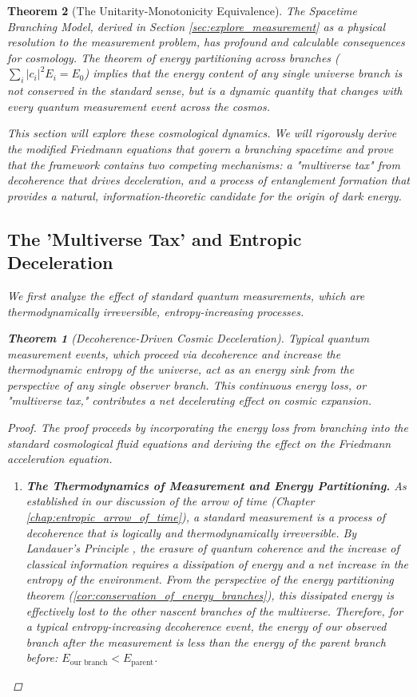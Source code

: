 \documentclass[11pt, letterpaper]{report}
\theoremstyle{plain} %
\newtheorem{theorem}{Theorem}[chapter]
\theoremstyle{definition} %
\theoremstyle{remark} %
\begin{document}
\begin{theorem}[The Unitarity-Monotonicity Equivalence]
The Spacetime Branching Model, derived in Section \ref{sec:explore_measurement} as a physical resolution to the measurement problem, has profound and calculable consequences for cosmology. The theorem of energy partitioning across branches ($\sum_i |c_i|^2 E_i = E_0$) implies that the energy content of any single universe branch is not conserved in the standard sense, but is a dynamic quantity that changes with every quantum measurement event across the cosmos.

This section will explore these cosmological dynamics. We will rigorously derive the modified Friedmann equations that govern a branching spacetime and prove that the framework contains two competing mechanisms: a "multiverse tax" from decoherence that drives deceleration, and a process of entanglement formation that provides a natural, information-theoretic candidate for the origin of dark energy.

\subsection{The 'Multiverse Tax' and Entropic Deceleration}
\label{subsec:explore_deceleration}

We first analyze the effect of standard quantum measurements, which are thermodynamically irreversible, entropy-increasing processes.

\begin{theorem}[Decoherence-Driven Cosmic Deceleration]
\label{thm:multiverse_tax}
Typical quantum measurement events, which proceed via decoherence and increase the thermodynamic entropy of the universe, act as an energy sink from the perspective of any single observer branch. This continuous energy loss, or "multiverse tax," contributes a net decelerating effect on cosmic expansion.
\end{theorem}
\begin{proof}
The proof proceeds by incorporating the energy loss from branching into the standard cosmological fluid equations and deriving the effect on the Friedmann acceleration equation.

\begin{enumerate}
    \item \textbf{The Thermodynamics of Measurement and Energy Partitioning.}
    As established in our discussion of the arrow of time (Chapter \ref{chap:entropic_arrow_of_time}), a standard measurement is a process of decoherence that is logically and thermodynamically irreversible. By Landauer's Principle \cite{Landauer1961, Bennett1982}, the erasure of quantum coherence and the increase of classical information requires a dissipation of energy and a net increase in the entropy of the environment. From the perspective of the energy partitioning theorem (\cref{cor:conservation_of_energy_branches}), this dissipated energy is effectively lost to the other nascent branches of the multiverse. Therefore, for a typical entropy-increasing decoherence event, the energy of our observed branch after the measurement is less than the energy of the parent branch before: $E_{\text{our branch}} < E_{\text{parent}}$.


\end{enumerate}
\end{proof}
\end{theorem}
\end{document}
